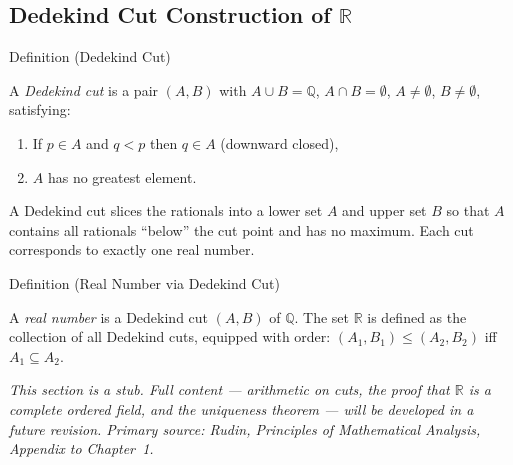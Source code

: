 
\subsection{\texorpdfstring{Dedekind Cut Construction of $\mathbb{R}$}{Dedekind Cut Construction of R}}

\begin{definitionbox}{Definition (Dedekind Cut)}
\begin{definition}\label{def:dedekind-cut}
A \emph{Dedekind cut} is a pair $(A, B)$ with $A \cup B = \mathbb{Q}$,
$A \cap B = \emptyset$, $A \neq \emptyset$, $B \neq \emptyset$, satisfying:
\begin{enumerate}
  \item If $p \in A$ and $q < p$ then $q \in A$ \quad (downward closed),
  \item $A$ has no greatest element.
\end{enumerate}
\end{definition}
\end{definitionbox}

\begin{remark*}
A Dedekind cut slices the rationals into a lower set $A$ and upper set $B$
so that $A$ contains all rationals ``below'' the cut point and has no maximum.
Each cut corresponds to exactly one real number.
\end{remark*}

\begin{definitionbox}{Definition (Real Number via Dedekind Cut)}
\begin{definition}\label{def:real-as-cut}
A \emph{real number} is a Dedekind cut $(A, B)$ of $\mathbb{Q}$.
The set $\mathbb{R}$ is defined as the collection of all Dedekind cuts,
equipped with order: $(A_1, B_1) \leq (A_2, B_2)$ iff $A_1 \subseteq A_2$.
\end{definition}
\end{definitionbox}

\begin{remark*}[Status]
\textit{This section is a stub. Full content --- arithmetic on cuts, the proof
that $\mathbb{R}$ is a complete ordered field, and the uniqueness theorem ---
will be developed in a future revision. Primary source: Rudin,
\textit{Principles of Mathematical Analysis}, Appendix to Chapter~1.}
\end{remark*}

